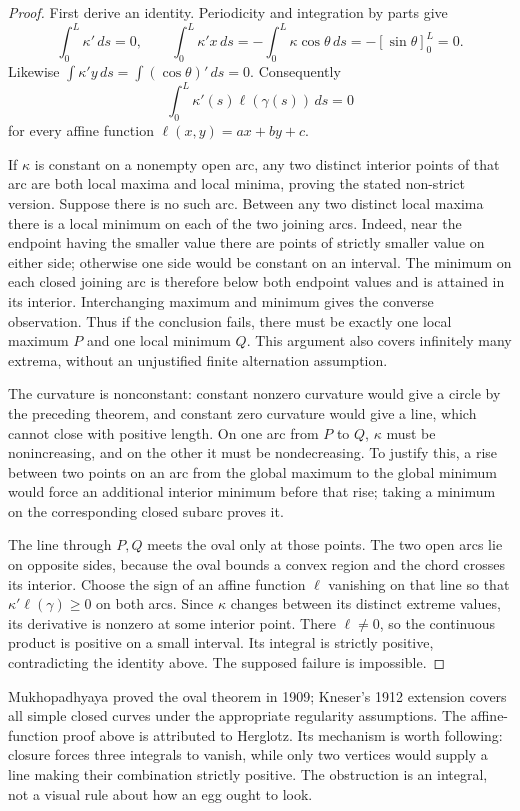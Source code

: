 \begin{proof}
First derive an identity. Periodicity and integration by parts give
\[
\int_0^L\kappa'\,ds=0,\qquad
\int_0^L\kappa'x\,ds=-\int_0^L\kappa\cos\theta\,ds
=-[\sin\theta]_0^L=0.
\]
Likewise $\int\kappa'y\,ds=\int(\cos\theta)'\,ds=0$. Consequently
\[
\int_0^L\kappa'(s)\ell(\gamma(s))\,ds=0
\]
for every affine function $\ell(x,y)=ax+by+c$.

If $\kappa$ is constant on a nonempty open arc, any two distinct interior points of that arc are both local maxima and local minima, proving the stated non-strict version. Suppose there is no such arc. Between any two distinct local maxima there is a local minimum on each of the two joining arcs. Indeed, near the endpoint having the smaller value there are points of strictly smaller value on either side; otherwise one side would be constant on an interval. The minimum on each closed joining arc is therefore below both endpoint values and is attained in its interior. Interchanging maximum and minimum gives the converse observation. Thus if the conclusion fails, there must be exactly one local maximum $P$ and one local minimum $Q$. This argument also covers infinitely many extrema, without an unjustified finite alternation assumption.

The curvature is nonconstant: constant nonzero curvature would give a circle by the preceding theorem, and constant zero curvature would give a line, which cannot close with positive length. On one arc from $P$ to $Q$, $\kappa$ must be nonincreasing, and on the other it must be nondecreasing. To justify this, a rise between two points on an arc from the global maximum to the global minimum would force an additional interior minimum before that rise; taking a minimum on the corresponding closed subarc proves it.

The line through $P,Q$ meets the oval only at those points. The two open arcs lie on opposite sides, because the oval bounds a convex region and the chord crosses its interior. Choose the sign of an affine function $\ell$ vanishing on that line so that $\kappa'\ell(\gamma)\ge0$ on both arcs. Since $\kappa$ changes between its distinct extreme values, its derivative is nonzero at some interior point. There $\ell\ne0$, so the continuous product is positive on a small interval. Its integral is strictly positive, contradicting the identity above. The supposed failure is impossible.
\end{proof}

Mukhopadhyaya proved the oval theorem in 1909; Kneser's 1912 extension covers all simple closed curves under the appropriate regularity assumptions. The affine-function proof above is attributed to Herglotz. Its mechanism is worth following: closure forces three integrals to vanish, while only two vertices would supply a line making their combination strictly positive. The obstruction is an integral, not a visual rule about how an egg ought to look.

